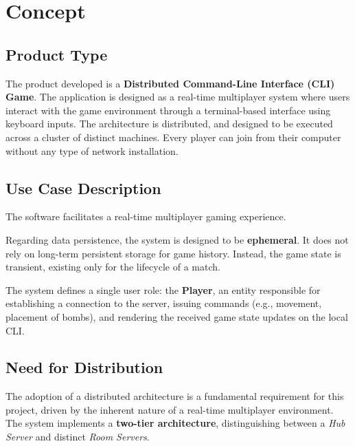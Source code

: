 \section{Concept}\label{concept}

\subsection{Product Type}
The product developed is a \textbf{Distributed Command-Line Interface (CLI) Game}.
The application is designed as a real-time multiplayer system where users interact with the game environment through a terminal-based interface using keyboard inputs.
The architecture is distributed, and designed to be executed across a cluster of distinct machines.
\newline
Every player can join from their computer without any type of network installation.

\subsection{Use Case Description}
The software facilitates a real-time multiplayer gaming experience.

Regarding data persistence, the system is designed to be \textbf{ephemeral}.
It does not rely on long-term persistent storage for game history.
Instead, the game state is transient, existing only for the lifecycle of a match.

The system defines a single user role: the \textbf{Player}, an entity responsible for establishing a connection to the server, issuing commands (e.g., movement, placement of bombs), and rendering the received game state updates on the local CLI.

\subsection{Need for Distribution}
The adoption of a distributed architecture is a fundamental requirement for this project, driven by the inherent nature of a real-time multiplayer environment.
The system implements a \textbf{two-tier architecture}, distinguishing between a \textit{Hub Server} and distinct \textit{Room Servers}.

